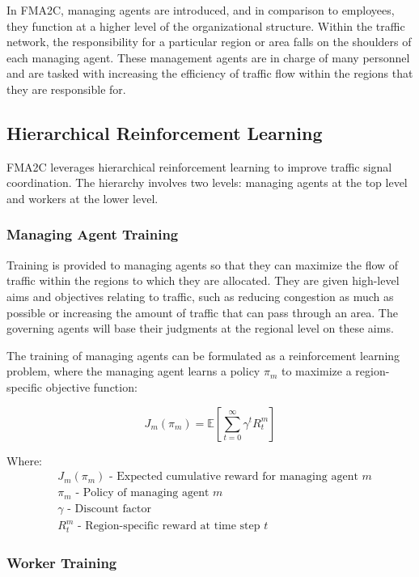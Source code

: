 In FMA2C, managing agents are introduced, and in comparison to employees, they function at a higher level of the organizational structure. Within the traffic network, the responsibility for a particular region or area falls on the shoulders of each managing agent. These management agents are in charge of many personnel and are tasked with increasing the efficiency of traffic flow within the regions that they are responsible for.

\subsection{Hierarchical Reinforcement Learning}

FMA2C leverages hierarchical reinforcement learning to improve traffic signal coordination. The hierarchy involves two levels: managing agents at the top level and workers at the lower level.

\subsubsection{Managing Agent Training}

Training is provided to managing agents so that they can maximize the flow of traffic within the regions to which they are allocated. They are given high-level aims and objectives relating to traffic, such as reducing congestion as much as possible or increasing the amount of traffic that can pass through an area. The governing agents will base their judgments at the regional level on these aims.

The training of managing agents can be formulated as a reinforcement learning problem, where the managing agent learns a policy \(\pi_m\) to maximize a region-specific objective function:

\[
J_m(\pi_m) = \mathbb{E}\left[\sum_{t=0}^{\infty} \gamma^t R_t^m\right]
\]

Where:
\begin{align*}
    &J_m(\pi_m) \text{ - Expected cumulative reward for managing agent } m\\
    &\pi_m \text{ - Policy of managing agent } m\\
    &\gamma \text{ - Discount factor}\\
    &R_t^m \text{ - Region-specific reward at time step } t
\end{align*}

\subsubsection{Worker Training}


